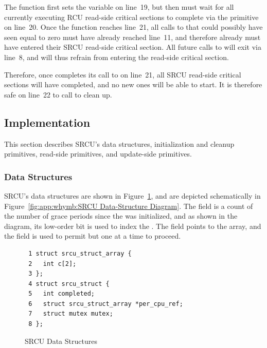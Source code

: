 The  function first sets the  variable
on line~19, but then must wait for all currently executing RCU read-side
critical sections to complete via the  primitive
on line~20.
Once the  function reaches line~21, all calls to
 that could possibly have seen  equal
to zero must have already reached line~11, and therefore already must
have entered their SRCU read-side critical section.
All future calls to  will exit via line~8, and will thus
refrain from entering the read-side critical section.

Therefore, once  completes its call to
 on line~21, all SRCU read-side critical sections
will have completed, and no new ones will be able to start.
It is therefore safe on line~22 to call 
to clean up.

\subsection{Implementation}
\label{sec:app:rcuimpl:Implementation}

This section describes SRCU's data structures, initialization and
cleanup primitives, read-side primitives, and update-side primitives.

\subsubsection{Data Structures}
\label{sec:app:rcuimpl:Data Structures}

SRCU's data structures are shown in
Figure~\ref{fig:app:rcuimpl:SRCU Data Structures},
and are depicted schematically in
Figure~\ref{fig:app:whymb:SRCU Data-Structure Diagram}.
The  field is a count of the number of grace periods
since the   was initialized, and as shown in the
diagram, its low-order bit is used to index the
 .
The  field points to the array, and the
 field is used to permit but one  at
a time to proceed.

\begin{figure}[htbp]
{ \scriptsize
\begin{verbatim}
 1 struct srcu_struct_array {
 2   int c[2];
 3 };
 4 struct srcu_struct {
 5   int completed;
 6   struct srcu_struct_array *per_cpu_ref;
 7   struct mutex mutex;
 8 };
\end{verbatim}
}
\caption{SRCU Data Structures}
\label{fig:app:rcuimpl:SRCU Data Structures}
\end{figure}

